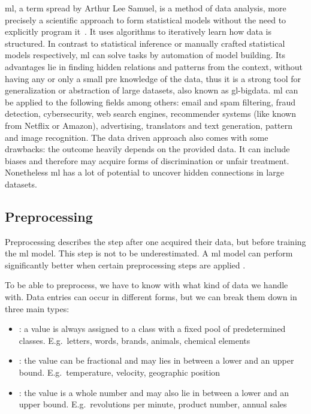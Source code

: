 \gls{ml}, a term spread by Arthur Lee Samuel, is a method of data analysis, more precisely a scientific approach to form statistical models without the need to explicitly program it~\cite{mahesh2020machine}.
It uses algorithms to iteratively learn how data is structured.
In contrast to statistical inference or manually crafted statistical models respectively, \gls{ml} can solve tasks by automation of model building.
Its advantages lie in finding hidden relations and patterns from the context, without having any or only a small pre knowledge of the data, thus it is a strong tool for generalization or abstraction of large datasets, also known as \gls{gl-bigdata}.
\gls{ml} can be applied to the following fields among others: email and spam filtering, fraud detection, cybersecurity, web search engines, recommender systems (like known from Netflix or Amazon), advertising, translators and text generation, pattern and image recognition.
The data driven approach also comes with some drawbacks: the outcome heavily depends on the provided data.
It can include biases and therefore may acquire forms of discrimination or unfair treatment.
Nonetheless \gls{ml} has a lot of potential to uncover hidden connections in large datasets.



\subsection{Preprocessing}
\label{subsec:preprocessing}

Preprocessing describes the step after one acquired their data, but before training the \gls{ml} model.
This step is not to be underestimated.
A \gls{ml} model can perform significantly better when certain preprocessing steps are applied \cite{alam2019impact}.

To be able to preprocess, we have to know with what kind of data we handle with.
Data entries can occur in different forms, but we can break them down in three main types:
\begin{itemize}
    \item {}: a value is always assigned to a class with a fixed pool of predetermined classes.
          E.g.\ letters, words, brands, animals, chemical elements
    \item {}: the value can be fractional and may lies in between a lower and an upper bound.
          E.g.\ temperature, velocity, geographic position
    \item {}: the value is a whole number and may also lie in between a lower and an upper bound.
          E.g.\ revolutions per minute, product number, annual sales
\end{itemize}

